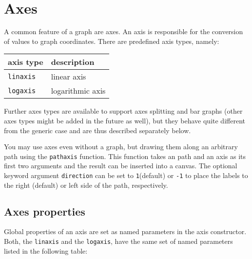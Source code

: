 \section{Axes}
\label{graph:axes}

A common feature of a graph are axes. An axis is responsible for the
conversion of values to graph coordinates. There are predefined axis
types, namely:
\begin{center}
\begin{tabular}{ll}
axis type&description\\
\hline
\texttt{linaxis}&linear axis\\
\texttt{logaxis}&logarithmic axis\\
\end{tabular}
\end{center}

Further axes types are available to support axes splitting and bar
graphs (other axes types might be added in the future as well), but
they behave quite different from the generic case and are thus
described separately below.

You may use axes even without a graph, but drawing them along an
arbitrary path using the \verb|pathaxis| function. This function takes
an path and an axis as its first two arguments and the result can be
inserted into a canvas. The optional keyword argument \verb|direction|
can be set to \verb|1|(default) or \verb|-1| to place the labels to
the right (default) or left side of the path, respectively.

\subsection{Axes properties}

Global properties of an axis are set as named parameters in the axis
constructor. Both, the \verb|linaxis| and the \verb|logaxis|, have the
same set of named parameters listed in the following table:

